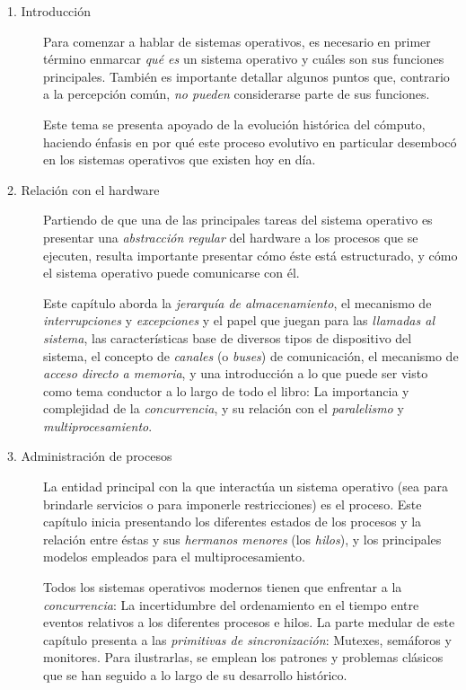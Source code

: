 \documentclass[11pt,fleqn]{book} %
\begin{document}
\begin{description}
\item[1. Introducción] Para comenzar a hablar de sistemas operativos, es
                  necesario en primer término enmarcar \emph{qué es} un
                  sistema operativo y cuáles son sus funciones
                  principales. También es importante detallar algunos
                  puntos que, contrario a la percepción común, \emph{no                   pueden} considerarse parte de sus funciones.

		  Este tema se presenta apoyado de la evolución
                  histórica del cómputo, haciendo énfasis en por qué
                  este proceso evolutivo en particular desembocó en
                  los sistemas operativos que existen hoy en día.
\item[2. Relación con el hardware] Partiendo de que una de las
     principales tareas del sistema operativo es presentar una
     \emph{abstracción regular} del hardware a los procesos que se
     ejecuten, resulta importante presentar cómo éste está
     estructurado, y cómo el sistema operativo puede comunicarse con
     él.

     Este capítulo aborda la \emph{jerarquía de almacenamiento}, el
     mecanismo de \emph{interrupciones} y \emph{excepciones} y el papel que
     juegan para las \emph{llamadas al sistema}, las características base
     de diversos tipos de dispositivo del sistema, el concepto de
     \emph{canales} (o \emph{buses}) de comunicación, el mecanismo de \emph{acceso      directo a memoria}, y una introducción a lo que puede ser visto
     como tema conductor a lo largo de todo el libro: La importancia
     y complejidad de la \emph{concurrencia}, y su relación con el
     \emph{paralelismo} y \emph{multiprocesamiento}.
\item[3. Administración de procesos] La entidad principal con la que
     interactúa un sistema operativo (sea para brindarle servicios o
     para imponerle restricciones) es el proceso. Este capítulo inicia
     presentando los diferentes estados de los procesos y la relación
     entre éstas y sus \emph{hermanos menores} (los \emph{hilos}), y los
     principales modelos empleados para el multiprocesamiento.

     Todos los sistemas operativos modernos tienen que enfrentar a la
     \emph{concurrencia}: La incertidumbre del ordenamiento en el tiempo
     entre eventos relativos a los diferentes procesos e hilos. La
     parte medular de este capítulo presenta a las \emph{primitivas de      sincronización}: Mutexes, semáforos y monitores. Para
     ilustrarlas, se emplean los patrones y problemas clásicos que se
     han seguido a lo largo de su desarrollo histórico.


\end{description}
\end{document}
